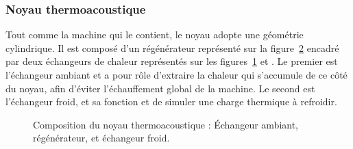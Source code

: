 \subsubsection{Noyau thermoacoustique}
Tout comme la machine qui le contient, le noyau adopte une géométrie cylindrique. Il est composé d'un régénérateur représenté sur la figure~\ref{fig:TacotPhotosNoyau_Regen} encadré par deux échangeurs de chaleur représentés sur les figures~\ref{fig:TacotPhotosNoyau_AHX} et . Le premier est l'échangeur ambiant et a pour rôle d'extraire la chaleur qui s'accumule de ce côté du noyau, afin d'éviter l'échauffement global de la machine. Le second est l'échangeur froid, et sa fonction et de simuler une charge thermique à refroidir. 

\begin{figure}[!ht]
    \centering
	\begin{subfigure}{.32\textwidth}
		\centering
		\caption{}
		\label{fig:TacotPhotosNoyau_AHX}
	\end{subfigure}		
	\begin{subfigure}{.32\textwidth}
		\centering
		\caption{}
		\label{fig:TacotPhotosNoyau_Regen}
	\end{subfigure}	
	\begin{subfigure}{.32\textwidth}
		\centering
		\caption{}
		\label{fig:TacotPhotosNoyau_CHX}
	\end{subfigure}	    
    \caption{Composition du noyau thermoacoustique :  \'Echangeur ambiant,  régénérateur, et  échangeur froid.}
    \label{fig:TacotPhotosNoyau}
\end{figure}

